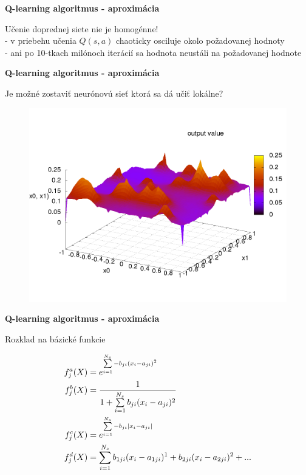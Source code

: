 \documentclass[xcolor=dvipsnames]{beamer}
\begin{document}
\begin{frame}{\bf Q-learning algoritmus - aproximácia}

Učenie doprednej siete nie je homogénne! \\
- v priebehu učenia $Q(s,a)$ chaoticky osciluje okolo požadovanej hodnoty \\
- ani po 10-tkach milónoch iterácií sa hodnota neustáli na požadovanej hodnote


\end{frame}


\begin{frame}{\bf Q-learning algoritmus - aproximácia}

Je možné zostaviť neurónovú sieť ktorá sa dá učiť lokálne?

\begin{figure}[!htb]
\includegraphics[scale=.35]{../pictures/gaussian.png}
\end{figure}

\end{frame}


\begin{frame}{\bf Q-learning algoritmus - aproximácia}

Rozklad na bázické funkcie

\begin{align}
    f_j^a(\boldmath{X}) &= e^{ \sum\limits_{i=1}^{N_s}{-b_{ji}(x_i - a_{ji})^2} } \\
    f_j^b(\boldmath{X}) &= \frac{1}{1 + \sum\limits_{i=1}^{N_s}{b_{ji}(x_i - a_{ji})^2}} \nonumber \\
    f_j^c(\boldmath{X}) &= e^{ \sum\limits_{i=1}^{N_s}{-b_{ji}\mid x_i - a_{ji} \mid} } \nonumber  \\
    f_j^d(\boldmath{X}) &= \sum\limits_{i=1}^{N_s}{ b_{1ji}(x_i - a_{1ji})^1 + b_{2ji}(x_i - a_{2ji})^2 + ...  } \nonumber
\end{align}

\end{frame}
\end{document}
